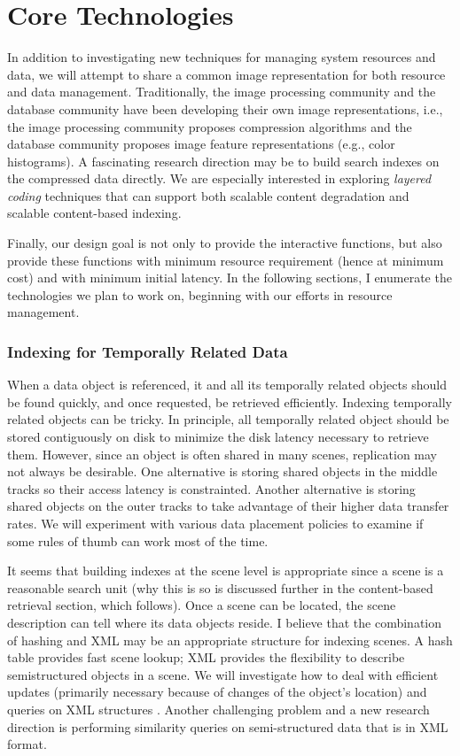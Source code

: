 \section{Core Technologies}

In addition to investigating new techniques for managing
system resources and data, we will attempt to share a common image
representation for both resource and data management.
Traditionally, the image processing community and the database 
community have been developing their own image representations, i.e.,
the image processing community proposes 
compression algorithms and the database community proposes image
feature representations (e.g., color histograms).
A fascinating research direction may be to build search indexes 
on the compressed data directly. We are especially interested
in exploring {\em layered coding} techniques that can support
both scalable content degradation and scalable content-based indexing.

Finally, our design goal is not only to provide the 
interactive functions, but also
provide these functions with minimum resource requirement
(hence at minimum cost) and with minimum initial latency.
In the following sections, I enumerate the technologies 
we plan to work on, beginning with our efforts in resource
management. 

\subsubsection{Indexing for Temporally Related Data}

When a data object
is referenced, it and all its temporally related objects should be
found quickly, and once requested, be retrieved efficiently. 
Indexing temporally related objects can be tricky.
In principle, all temporally related object should be 
stored contiguously on disk to minimize the disk latency 
necessary to retrieve them.
However, since an object is often shared in many scenes,
replication may not always be desirable. One alternative is
storing shared objects in the middle tracks so their
access latency is constrainted. Another alternative
is storing shared objects on the outer tracks to take
advantage of their higher data transfer rates. 
We will experiment with various data placement policies to
examine if some rules of thumb can work most of the time.

It seems that building indexes at the scene level is
appropriate since a scene is a reasonable search 
unit (why this is so is discussed further 
in the content-based retrieval section,
which follows). Once a scene can be located, the 
scene description can tell where its data objects
reside. I believe that the combination of hashing and XML
may be an appropriate structure for indexing scenes.
A hash table provides fast scene lookup; XML
provides the flexibility to describe semistructured
objects in a scene. We will investigate how to
deal with efficient updates (primarily necessary because of changes
of the object's location)
and queries on XML structures \cite{Abi97,Bun97,MW99}.
Another challenging problem and a new research direction
is performing similarity queries on semi-structured 
data that is in XML format.

